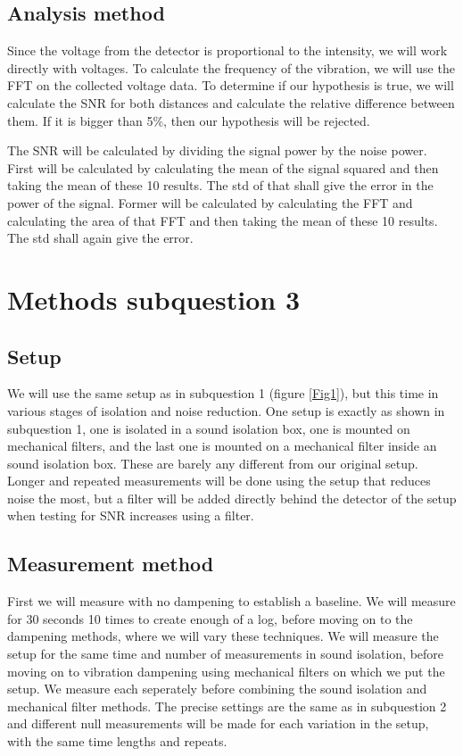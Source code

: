 \documentclass[a4paper,11pt]{article} %
\begin{document}
\subsection{Analysis method}

Since the voltage from the detector is proportional to the intensity, we will work directly with voltages. To calculate the frequency of the vibration, we will use the FFT on the collected voltage data. To determine if our hypothesis is true, we will calculate the SNR for both distances and calculate the relative difference between them. If it is bigger than 5\%, then our hypothesis will be rejected. 

The SNR will be calculated by dividing the signal power by the noise power. First will be calculated by calculating the mean of the signal squared and then taking the mean of these 10 results. The std of that shall give the error in the power of the signal. Former will be calculated by calculating the FFT and calculating the area of that FFT and then taking the mean of these 10 results. The std shall again give the error.


\section{Methods subquestion 3}

\subsection{Setup}
We will use the same setup as in subquestion 1 (figure \ref{Fig1}), but this time in various stages of isolation and noise reduction. One setup is exactly as shown in subquestion 1, one is isolated in a sound isolation box, one is mounted on mechanical filters, and the last one is mounted on a mechanical filter inside an sound isolation box. These are barely any different from our original setup. Longer and repeated measurements will be done using the setup that reduces noise the most, but a filter will be added directly behind the detector of the setup when testing for SNR increases using a filter.

\subsection{Measurement method}
First we will measure with no dampening to establish a baseline. We will measure for 30 seconds 10 times to create enough of a log, before moving on to the dampening methods, where we will vary these techniques. We will measure the setup for the same time and number of measurements in sound isolation, before moving on to vibration dampening using mechanical filters on which we put the setup. We measure each seperately before combining the sound isolation and mechanical filter methods. The precise settings are the same as in subquestion 2 and different null measurements will be made for each variation in the setup, with the same time lengths and repeats.
\end{document}
